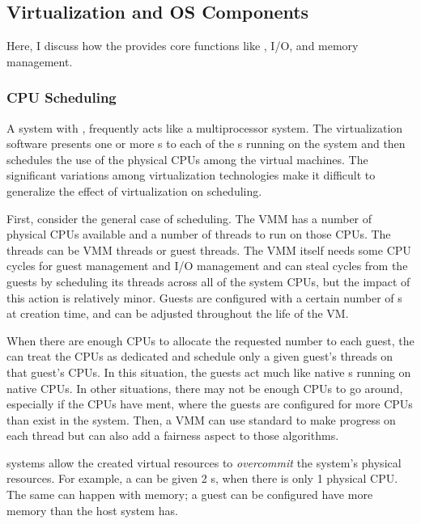 \subsection{Virtualization and OS Components}\label{subsec:Virtualization_OS_Components}
Here, I discuss how the  provides core  functions like , I/O, and memory management.

\subsubsection{CPU Scheduling}\label{subsubsec:VM_CPU_Scheduling}
A system with , frequently acts like a multiprocessor system.
The virtualization software presents one or more s to each of the s running on the system and then schedules the use of the physical CPUs among the virtual machines.
The significant variations among virtualization technologies make it difficult to generalize the effect of virtualization on scheduling.

First, consider the general case of  scheduling.
The VMM has a number of physical CPUs available and a number of threads to run on those CPUs.
The threads can be VMM threads or guest threads.
The VMM itself needs some CPU cycles for guest management and I/O management and can steal cycles from the guests by scheduling its threads across all of the system CPUs, but the impact of this action is relatively minor.
Guests are configured with a certain number of s at creation time, and can be adjusted throughout the life of the VM.\@

When there are enough CPUs to allocate the requested number to each guest, the  can treat the CPUs as dedicated and schedule only a given guest's threads on that guest's CPUs.
In this situation, the guests act much like native s running on native CPUs.
In other situations, there may not be enough CPUs to go around, especially if the CPUs have ment, where the guests are configured for more CPUs than exist in the system.
Then, a VMM can use standard  to make progress on each thread but can also add a fairness aspect to those algorithms.

\begin{definition}[Overcommit]\label{def:Overcommit}
   systems allow the created virtual resources to \emph{overcommit} the system's physical resources.
  For example, a  can be given 2 s, when there is only 1 physical CPU.\@
  The same can happen with memory; a guest can be configured have more memory than the host system has.
\end{definition}


